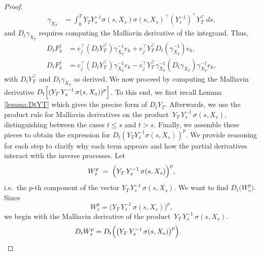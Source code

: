 \documentclass[]{interact}
\newcommand{\1}{\mathbf{1}}
\theoremstyle{plain}%
\theoremstyle{definition}
\theoremstyle{remark}
\numberwithin{equation}{section}
\begin{document}
\begin{proof}
\begin{align*}
\gamma_{X_T} &= \int_0^T Y_T Y_s^{-1} \sigma(s, X_s) \sigma(s, X_s)^\top (Y_s^{-1})^\top Y_T^\top \, ds,
\end{align*}
and \( D_t \gamma_{X_T} \) requires computing the Malliavin derivative 
of the integrand. Thus,
\begin{align*}
D_t F_k^j &= e_j^\top (D_t Y_T^\top) \gamma_{X_T}^{-1} e_k + e_j^\top Y_T^\top D_t (\gamma_{X_T}^{-1}) e_k, \\
D_t F_k^j &= e_j^\top (D_t Y_T^\top) \gamma_{X_T}^{-1} e_k - e_j^\top Y_T^\top \gamma_{X_T}^{-1} (D_t \gamma_{X_T}) \gamma_{X_T}^{-1} e_k,
\end{align*}
with \( D_t Y_T^\top \) and \( D_t \gamma_{X_T} \) as derived.
%
%
We now proceed by computing the Malliavin derivative 
\(\displaystyle D_t \Bigl[(Y_T\,Y_s^{-1}\,\sigma(s,X_s))^p\Bigr]\). 
To this end, we first recall Lemma \ref{lemma:DtYT} which gives  the 
precise form of \(\displaystyle D_t Y_T\). Afterwards, we use the product 
rule for Malliavin derivatives on the product \(\,Y_T \,Y_s^{-1}\,\sigma(s,X_s)\), 
distinguishing between the cases \(t \le s\) and \(t > s\). 
Finally, we assemble these pieces to obtain the expression for 
\(\displaystyle D_t (Y_T Y_s^{-1} \sigma(s, X_s))^p\).  
We provide reasoning for each step to clarify why each term appears 
and how the partial derivatives interact with the inverse processes.
%
Let 
\[
W_s^p 
\;=\;
\Bigl(Y_T\,Y_s^{-1}\,\sigma(s, X_s)\Bigr)^p,
\]
i.e.\ the \(p\)-th component of the vector \(Y_T\,Y_s^{-1}\,\sigma(s,X_s)\).  
We want to find 
\(\displaystyle D_t \bigl(W_s^p\bigr)\).  
Since
\[
W_s^p 
= 
\bigl(Y_T\,Y_s^{-1}\,\sigma(s, X_s)\bigr)^p,
\]
we begin with the Malliavin derivative of the product 
\(\,Y_T\,Y_s^{-1}\,\sigma(s,X_s)\).  
%
\begin{align*}
D_t W_s^p 
&= 
D_t \Bigl(\bigl(Y_T\,Y_s^{-1}\,\sigma(s, X_s)\bigr)^p\Bigr).
\end{align*}


\end{proof}
\end{document}
